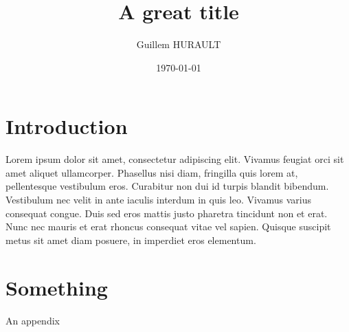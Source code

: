 \documentclass[a4paper, english, abstracton, 12pt]{scrartcl}
\title{A great title}
\author{Guillem HURAULT}
\date{\today}
\begin{document}
\maketitle

\setcounter{tocdepth}{2}
\tableofcontents

\pagebreak

% 
\section{Introduction}

Lorem ipsum dolor sit amet, consectetur adipiscing elit. Vivamus feugiat orci sit amet aliquet ullamcorper. Phasellus nisi diam, fringilla quis lorem at, pellentesque vestibulum eros. Curabitur non dui id turpis blandit bibendum. Vestibulum nec velit in ante iaculis interdum in quis leo. Vivamus varius consequat congue. Duis sed eros mattis justo pharetra tincidunt non et erat. Nunc nec mauris et erat rhoncus consequat vitae vel sapien. Quisque suscipit metus sit amet diam posuere, in imperdiet eros elementum.

\cite{Shmueli2010}

\clearpage
\appendix
{}
\appendixpage
% 

\section{Something}

An appendix

\clearpage
\small
\printbibliography[heading=bibintoc, title={References}]
\end{document}
